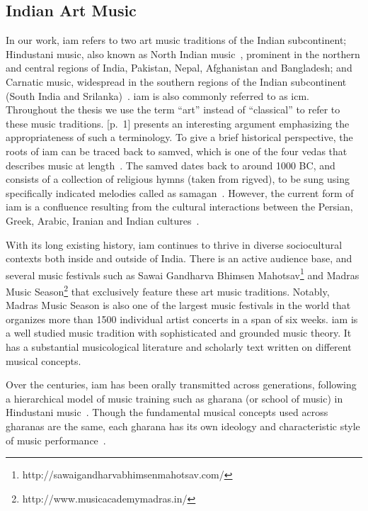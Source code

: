\subsection{Indian Art Music}
\label{sec:music_background_iam}

In our work, \acrfull{iam} refers to two art music traditions of the Indian subcontinent; Hindustani music, also known as North Indian music~\citep{Bor2010, Danielou2010}, prominent in the northern and central regions of India, Pakistan, Nepal, Afghanistan and Bangladesh; and Carnatic music, widespread in the southern regions of the Indian subcontinent (South India and Srilanka)~\citep{Singh1995,Viswanathan2004}. \gls{iam} is also commonly referred to as \gls{icm}. Throughout the thesis we use the term ``art'' instead of ``classical'' to refer to these music traditions. \cite{Raja2012}[p.~1] presents an interesting argument emphasizing the appropriateness of such a terminology. To give a brief historical perspective, the roots of \gls{iam} can be traced back to \gls{samved}, which is one of the four \gls{vedas} that describes music at length~\citep{Trivedi2008,Singh1995}. The \gls{samved} dates back to around 1000 BC, and consists of a collection of religious hymns (taken from \gls{rigved}), to be sung using specifically indicated melodies called as \gls{samagan}~\citep{Griffith2004}. However, the current form of \gls{iam} is a confluence resulting from the cultural interactions between the Persian, Greek, Arabic, Iranian and Indian cultures~\citep{Kaul2007,Saraf2011,Singh1995}.

With its long existing history, \gls{iam} continues to thrive in diverse sociocultural contexts both inside and outside of India. There is an active audience base, and several music festivals such as Sawai Gandharva Bhimsen Mahotsav\footnote{http://sawaigandharvabhimsenmahotsav.com/} and Madras Music Season\footnote{http://www.musicacademymadras.in/} that exclusively feature these art music traditions. Notably, Madras Music Season is also one of the largest music festivals in the world that organizes more than 1500 individual artist concerts in a span of six weeks. \Gls{iam} is a well studied music tradition with sophisticated and grounded music theory. It has a substantial musicological literature and scholarly text written on different musical concepts. 

Over the centuries, \gls{iam} has been orally transmitted across generations, following a hierarchical model of music training such as \gls{gharana} (or school of music) in Hindustani music~\citep{Saraf2011,Mehta2008}. Though the fundamental musical concepts used across \glspl{gharana} are the same, each \gls{gharana} has its own ideology and characteristic style of music performance~\citep{Deshpande1989}. 

